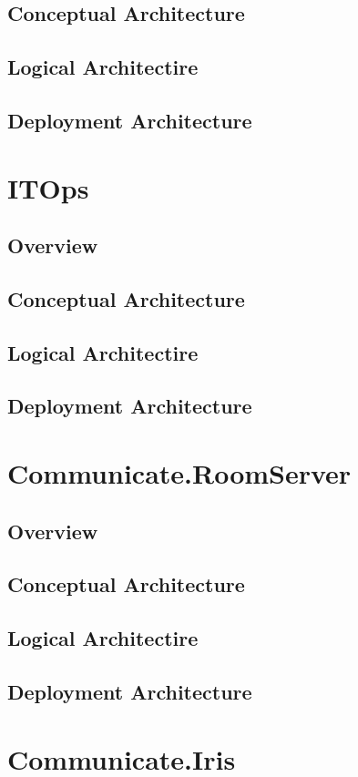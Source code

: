 \documentclass[a4paper]{book}
\begin{document}
\section{Conceptual Architecture}
\section{Logical Architectire}
\section{Deployment Architecture}

\chapter{ITOps}
\section{Overview}
\section{Conceptual Architecture}
\section{Logical Architectire}
\section{Deployment Architecture}

\chapter{Communicate.RoomServer}
\section{Overview}
\section{Conceptual Architecture}
\section{Logical Architectire}
\section{Deployment Architecture}

\chapter{Communicate.Iris}
\end{document}
